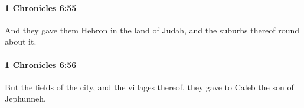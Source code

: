 		\paragraph{1 Chronicles 6:55} %
			\label{1CHRONICLES-6-55}

			And they gave them Hebron in the land of Judah, and the suburbs thereof round about it.


		\paragraph{1 Chronicles 6:56} %
			\label{1CHRONICLES-6-56}

			But the fields of the city, and the villages thereof, they gave to Caleb the son of Jephunneh.


